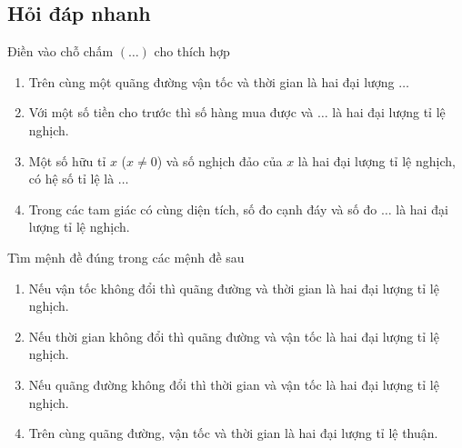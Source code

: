 \subsection{Hỏi đáp nhanh}
\begin{ex}%
Điền vào chỗ chấm $\left(\ldots\right)$ cho thích hợp
\begin{enumerate}
	\item Trên cùng một quãng đường vận tốc và thời gian là hai đại lượng $\ldots$ 
	\item Với một số tiền cho trước thì số hàng mua được và $\ldots$ là hai đại lượng tỉ lệ nghịch.
	\item Một số hữu tỉ $x$ ($x\neq 0$) và số nghịch đảo của $x$ là hai đại lượng tỉ lệ nghịch, có hệ số tỉ lệ là $\ldots$
	\item  Trong các tam giác có cùng diện tích, số đo cạnh đáy và số đo $\ldots$ là hai đại lượng tỉ lệ nghịch.
\end{enumerate}		
\end{ex}

\begin{ex}%
Tìm mệnh đề đúng trong các mệnh đề sau
	\begin{enumerate}
		\item  Nếu vận tốc không đổi thì quãng đường và thời gian là hai đại lượng tỉ lệ nghịch. 
		\item Nếu thời gian không đổi thì quãng đường và vận tốc là hai đại lượng tỉ lệ nghịch.
		\item Nếu quãng đường không đổi thì thời gian và vận tốc là hai đại lượng tỉ lệ nghịch.
		\item  Trên cùng quãng đường, vận tốc và thời gian là hai đại lượng tỉ lệ thuận.
	\end{enumerate}		
\end{ex}

